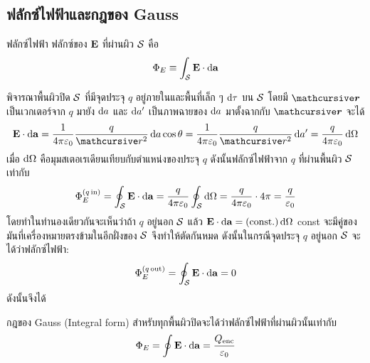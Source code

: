 \subsection{ฟลักซ์ไฟฟ้าและกฎของ Gauss}
\begin{defbox}{ฟลักซ์ไฟฟ้า}
    ฟลักซ์ของ $\mathbf{E}$ ที่ผ่านผิว $\mathcal{S}$ คือ
    \begin{equation}
        \Phi_E\equiv\int_\sur\vb{E}\cdot\odif{\vb{a}}
    \end{equation}
\end{defbox}
พิจารณาพื้นผิวปิด $\mathcal{S}$ ที่มีจุดประจุ $q$ อยู่ภายในและพื้นที่เล็ก ๆ $\odif{\tau}$ บน $\mathcal{S}$ โดยมี $\vbs{\rad}$ เป็นเวกเตอร์จาก $q$ มายัง $\odif{a}$ และ $\odif{a'}$ เป็นภาพฉายของ $\odif{a}$ มาตั้งฉากกับ $\vbs{\rad}$ จะได้
\[
\vb{E}\cdot \odif{\vb{a}}=\kem\frac{q}{\rad^2}\odif{a}\cos\theta=\kem\frac{q}{\rad^2}\odif{a'}=\frac{q}{4\pi\eps_0}\odif{\Omega}
\]
เมื่อ $\odif{\Omega}$ คือมุมสเตอเรเดียนเทียบกับตำแหน่งของประจุ $q$ ดังนั้นฟลักซ์ไฟฟ้าจาก $q$ ที่ผ่านพื้นผิว $\mathcal{S}$ เท่ากับ
\begin{equation}
\Phi_E^{(q\,\txt{in})}=\oint_\sur\vb{E}\cdot\odif{\vb{a}}=\frac{q}{4\pi\eps_0}\oint_\sur\odif{\Omega}=\frac{q}{4\pi\eps_0}\cdot4\pi=\frac{q}{\eps_0}
\end{equation}
โดยทำในทำนองเดียวกันจะเห็นว่าถ้า $q$ อยู่นอก $\mathcal{S}$ แล้ว $\vb{E}\cdot\odif{\vb{a}}=(\cst)\odif{\Omega}$ const จะมีคู่ของมันที่เครื่องหมายตรงข้ามในอีกฝั่งของ $\mathcal{S}$ จึงทำให้ตัดกันหมด ดังนั้นในกรณีจุดประจุ $q$ อยู่นอก $\mathcal{S}$ จะได้ว่าฟลักซ์ไฟฟ้า:
\begin{equation}
\Phi_E^{(q\,\txt{out})}=\oint_\sur\vb{E}\cdot\odif{\vb{a}}=0
\end{equation}
ดังนั้นจึงได้
\begin{lawbox}{กฎของ Gauss (Integral form)}
    สำหรับทุกพื้นผิวปิดจะได้ว่าฟลักซ์ไฟฟ้าที่ผ่านผิวนั้นเท่ากับ
    \begin{equation}
        \Phi_E=\oint\vb{E}\cdot\odif{\vb{a}}=\frac{Q_\txt{enc}}{\eps_0}\label{gauss}
    \end{equation}
\end{lawbox}


